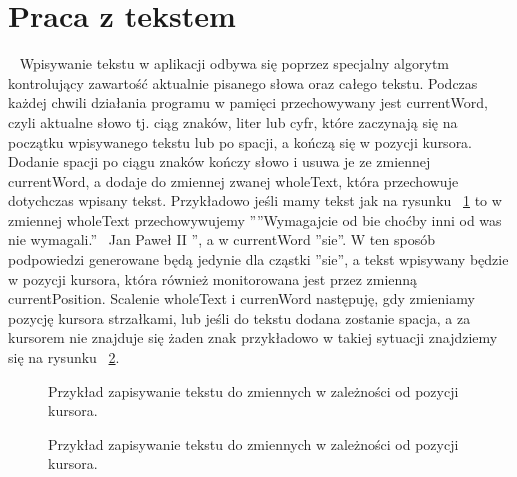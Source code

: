 \documentclass[twoside,a4paper]{book}
\begin{document}
\section{Praca z tekstem}~\label{sec:text}
Wpisywanie tekstu w aplikacji odbywa się poprzez specjalny algorytm kontrolujący zawartość aktualnie pisanego słowa oraz całego tekstu. Podczas każdej chwili działania programu w pamięci przechowywany jest currentWord, czyli aktualne słowo tj. ciąg znaków, liter lub cyfr, które zaczynają się na początku wpisywanego tekstu lub po spacji, a kończą się w pozycji kursora. Dodanie spacji po ciągu znaków kończy słowo i usuwa je ze zmiennej currentWord, a dodaje do zmiennej zwanej wholeText, która przechowuje dotychczas wpisany tekst. Przykładowo jeśli mamy tekst jak na rysunku ~\ref{fig:sentence} to w zmiennej wholeText przechowywujemy ''''Wymagajcie od bie choćby inni od was nie wymagali.'' ~Jan Paweł II '', a w currentWord ''sie''. W ten sposób podpowiedzi generowane będą jedynie dla cząstki ''sie'', a tekst wpisywany będzie w pozycji kursora, która również monitorowana jest przez zmienną currentPosition. Scalenie wholeText i currenWord następuję, gdy zmieniamy pozycję kursora strzałkami, lub jeśli do tekstu dodana zostanie spacja, a za kursorem nie znajduje się żaden znak przykładowo w takiej sytuacji znajdziemy się na rysunku ~\ref{fig:sentence2}. 
\begin{figure}[!h]
		\centering
		\caption{Przykład zapisywanie tekstu do zmiennych w zależności od pozycji kursora.}
		\label{fig:sentence}
\end{figure}
\begin{figure}[!h]
		\centering
		\caption{Przykład zapisywanie tekstu do zmiennych w zależności od pozycji kursora.}
		\label{fig:sentence2}
\end{figure}
\end{document}
